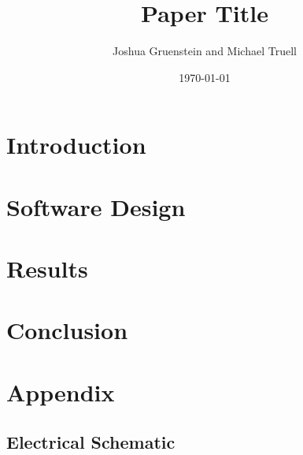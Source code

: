 \documentclass[a4paper,12pt]{article}
\title{Paper Title}
\author{Joshua Gruenstein and Michael Truell}
\date{\today}
\begin{document}
\maketitle



\section{Introduction}



\section{Software Design}



%

\section{Results}



\section{Conclusion}



\pagebreak
\section{Appendix}

\subsection{Electrical Schematic}



\nocite{wirefit,qlearn,backprop,practical,tutorial,kinematics}

\pagebreak


\end{document}
